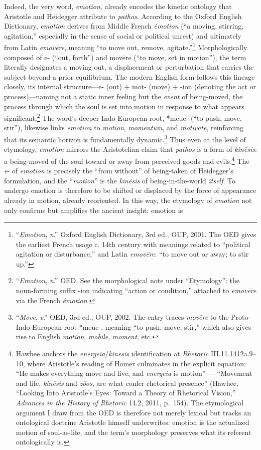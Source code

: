 \documentclass{article}
\begin{document}
Indeed, the very word, \textit{emotion}, already encodes the kinetic ontology that Aristotle and Heidegger attribute to \textit{pathos}. According to the Oxford English Dictionary, \textit{emotion} derives from Middle French \textit{émotion} (“a moving, stirring, agitation,” especially in the sense of social or political unrest) and ultimately from Latin \textit{emovēre}, meaning “to move out, remove, agitate.”\footnote{“\textit{Emotion}, \textit{n}.” Oxford English Dictionary, 3rd ed., OUP, 2001. The OED gives the earliest French usage c. 14th century with meanings related to “political agitation or disturbance,” and Latin \textit{emovēre}: “to move out or away; to stir up.”} Morphologically composed of e- (“out, forth”) and movēre (“to move, set in motion”), the term  literally designates a moving-out, a displacement or perturbation that carries the subject beyond a prior equilibrium. The modern English form follows this lineage closely, its internal structure—e- (out) + mot- (move) + -ion (denoting the act or process)—naming not a static inner feeling but the \textit{event} of being-moved, the process through which the soul is set into motion in response to what appears significant.\footnote{“\textit{Emotion}, \textit{n}.” OED. See the morphological note under “Etymology”: the noun-forming suffix -ion indicating “action or condition,” attached to \textit{emovēre} via the French \textit{émotion}.} The word’s deeper Indo-European root, *meue- (“to push, move, stir”), likewise links \textit{emotion} to \textit{motion}, \textit{momentum}, and \textit{motivate}, reinforcing that its semantic horizon is fundamentally dynamic.\footnote{“\textit{Move}, \textit{v}.” OED, 3rd ed., OUP, 2002. The entry traces \textit{movēre} to the Proto-Indo-European root *meue-, meaning “to push, move, stir,” which also gives rise to English \textit{motion}, \textit{mobile}, \textit{moment}, etc.}  Thus even at the level of etymology, \textit{emotion} mirrors the Aristotelian claim that \textit{pathos} is a form of \textit{kinēsis}: a being-moved of the soul toward or away from perceived goods and evils.\footnote{Hawhee anchors the \textit{energeia}/\textit{kinēsis} identification at \textit{Rhetoric} III.11.1412a.9--10, where Aristotle's reading of Homer culminates in the explicit equation: ``He makes everything move and live, and \textit{energeia} is motion'' --- ``Movement and life, \textit{kinēsis} and \textit{zōos}, are what confer rhetorical presence'' (Hawhee, ``Looking Into Aristotle's Eyes: Toward a Theory of Rhetorical Vision,'' \textit{Advances in the History of Rhetoric} 14.2, 2011, p.~154). The etymological argument I draw from the OED is therefore not merely lexical but tracks an ontological doctrine Aristotle himself underwrites: emotion is the actualized motion of soul-as-life, and the term's morphology preserves what its referent ontologically is.} The \textit{e}- of \textit{emotion} is precisely the ``from without'' of being-taken of Heidegger's formulation, and the ``\textit{motion}'' is the \textit{kinēsis} of being-in-the-world \textit{itself}. To undergo emotion is therefore to be shifted or displaced by the force of appearance already in motion, already reoriented. In this way, the etymology of \textit{emotion} not only confirms but amplifies the ancient insight: emotion is 
\end{document}
